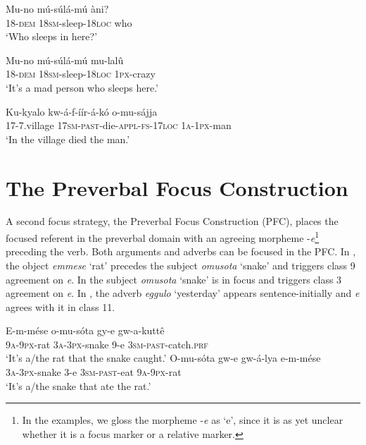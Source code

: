 \documentclass[output=paper]{langsci/langscibook}
\begin{document}
\ea\label{ex:vanderwal:8}
\ea\label{ex:vanderwal:8a}
\gll  Mu-no    mú-súlá-mú    àni?\\
       18-\textsc{dem}  \textsc{18sm}-sleep-\textsc{18loc}  who\\
\glt   ‘Who sleeps in here?’

\ex\label{ex:vanderwal:8b}
\gll  Mu-no    mú-súlá-mú    mu-lalû\\
       18-\textsc{dem}  1\textsc{8sm}-sleep-\textsc{18loc}  \textsc{1px}-crazy\\
\glt   ‘It’s a mad person who sleeps here.’
\z
\z

\ea\label{ex:vanderwal:9}
\gll Ku-kyalo  kw-á-f-íír-á-kó      o-mu-sájja\\
     17-7.village  \textsc{17sm}-\textsc{past}-die-\textsc{appl}-\textsc{fs}-\textsc{17loc}  \textsc{1a-1px}-man\\
\glt ‘In the village died the man.’
\z

\section{The Preverbal Focus Construction}\label{sec:vanderwal:3}
 

A second focus strategy, the Preverbal Focus Construction (PFC), places the focused referent in the preverbal domain with an agreeing morpheme -\textit{e}\footnote{In the examples, we gloss the morpheme -\textit{e} as ‘e’, since it is as yet unclear whether it is a focus marker or a relative marker.}{} preceding the verb. Both arguments and adverbs can be focused in the PFC. In , the object \textit{emmese} ‘rat’ precedes the subject \textit{omusota} ‘snake’ and triggers class 9 agreement on \textit{e}. In  the subject \textit{omusota} ‘snake’ is in focus and triggers class 3 agreement on \textit{e}. In , the adverb \textit{eggulo} ‘yesterday’ appears sentence-initially and \textit{e} agrees with it in class 11.

\ea\label{ex:vanderwal:10}
\ea\label{ex:vanderwal:10a}
\gll    E-m-mése  o-mu-sóta    gy-e  gw-a-kuttê{\textup{} }\\
       \textsc{9a-9px}-rat  \textsc{3a}-\textsc{3px}-snake  9-e  \textsc{3sm}-\textsc{past}-catch.\textsc{prf}\\
\glt   ‘It’s a/the rat that the snake caught.’
\ex\label{ex:vanderwal:10b}
\gll    O-mu-sóta    gw-e  gw-á-lya    e-m-mése\\
       \textsc{3a-3px}-snake  3-e  \textsc{3sm-past}-eat  \textsc{9a-9px}-rat\\
\glt   ‘It’s a/the snake that ate the rat.’
\z
\z
\end{document}
